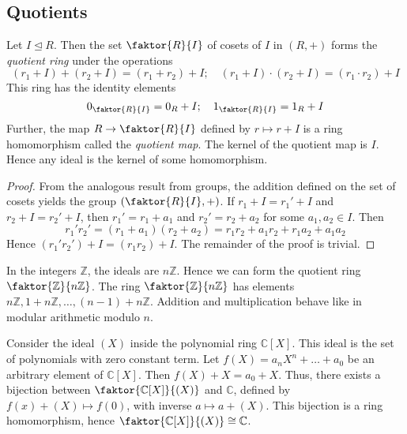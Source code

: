 \subsection{Quotients}
\begin{theorem}
	Let \( I \trianglelefteq R \).
	Then the set \( \faktor{R}{I} \) of cosets of \( I \) in \( (R, +) \) forms the \textit{quotient ring} under the operations
	\[ (r_1 + I) + (r_2 + I) = (r_1 + r_2) + I;\quad (r_1 + I) \cdot (r_2 + I) = (r_1 \cdot r_2) + I \]
	This ring has the identity elements
	\[ 0_{\faktor{R}{I}} = 0_R + I;\quad 1_{\faktor{R}{I}} = 1_R + I \]
	Further, the map \( R \to \faktor{R}{I} \) defined by \( r \mapsto r + I \) is a ring homomorphism called the \textit{quotient map}.
	The kernel of the quotient map is \( I \).
	Hence any ideal is the kernel of some homomorphism.
\end{theorem}
\begin{proof}
	From the analogous result from groups, the addition defined on the set of cosets yields the group \( \qty(\faktor{R}{I}, +) \).
	If \( r_1 + I = r_1' + I \) and \( r_2 + I = r_2' + I \), then \( r_1' = r_1 + a_1 \) and \( r_2' = r_2 + a_2 \) for some \( a_1, a_2 \in I \).
	Then
	\[ r_1' r_2' = (r_1 + a_1)(r_2 + a_2) = r_1 r_2 + a_1 r_2 + r_1 a_2 + a_1 a_2 \]
	Hence \( (r_1' r_2') + I = (r_1 r_2) + I \).
	The remainder of the proof is trivial.
\end{proof}
\begin{example}
	In the integers \( \mathbb Z \), the ideals are \( n\mathbb Z \).
	Hence we can form the quotient ring \( \faktor{\mathbb Z}{n\mathbb Z} \).
	The ring \( \faktor{\mathbb Z}{n\mathbb Z} \) has elements \( n\mathbb Z, 1 + n\mathbb Z, \dots, (n-1) + n\mathbb Z \).
	Addition and multiplication behave like in modular arithmetic modulo \( n \).
\end{example}
\begin{example}
	Consider the ideal \( (X) \) inside the polynomial ring \( \mathbb C[X] \).
	This ideal is the set of polynomials with zero constant term.
	Let \( f(X) = a_n X^n + \dots + a_0 \) be an arbitrary element of \( \mathbb C[X] \).
	Then \( f(X) + X = a_0 + X \).
	Thus, there exists a bijection between \( \faktor{\mathbb C[X]}{(X)} \) and \( \mathbb C \), defined by \( f(x) + (X) \mapsto f(0) \), with inverse \( a \mapsto a + (X) \).
	This bijection is a ring homomorphism, hence \( \faktor{\mathbb C[X]}{(X)} \cong \mathbb C \).
\end{example}
